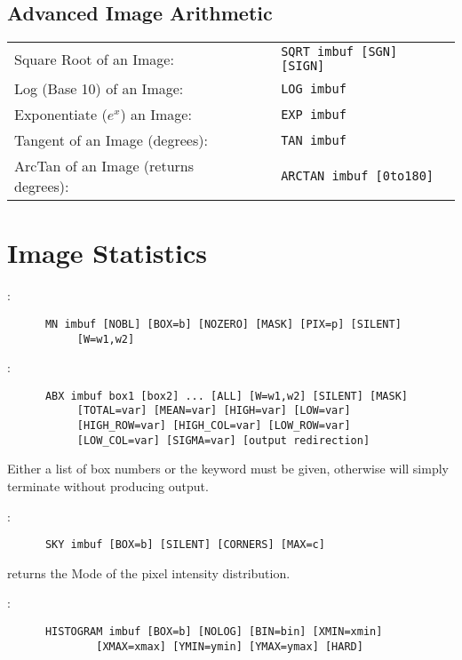\subsection{Advanced Image Arithmetic}

\begin{center}
   \begin{tabular}{lcl}
      Square Root of an Image:&&\verb+SQRT imbuf [SGN] [SIGN]+\\
      Log (Base 10) of an Image:&&\verb+LOG imbuf+\\
      Exponentiate ($e^x$) an Image:&&\verb+EXP imbuf+\\
      Tangent of an Image (degrees):&&\verb+TAN imbuf+\\
      ArcTan of an Image (returns degrees):&&\verb+ARCTAN imbuf [0to180]+\\
   \end{tabular}
\end{center}


\section{Image Statistics}

:
\begin{verbatim}
      MN imbuf [NOBL] [BOX=b] [NOZERO] [MASK] [PIX=p] [SILENT]
	       [W=w1,w2]
\end{verbatim}

\noindent {}:
\begin{verbatim}
      ABX imbuf box1 [box2] ... [ALL] [W=w1,w2] [SILENT] [MASK]
		   [TOTAL=var] [MEAN=var] [HIGH=var] [LOW=var]
		   [HIGH_ROW=var] [HIGH_COL=var] [LOW_ROW=var]
		   [LOW_COL=var] [SIGMA=var] [output redirection]
\end{verbatim}

\noindent Either a list of box numbers or the keyword  must be
given, otherwise  will simply terminate without producing output.

\noindent {}:
\begin{verbatim}
      SKY imbuf [BOX=b] [SILENT] [CORNERS] [MAX=c]
\end{verbatim}
 returns the Mode of the pixel intensity distribution.

\noindent {}:
\begin{verbatim}
      HISTOGRAM imbuf [BOX=b] [NOLOG] [BIN=bin] [XMIN=xmin]
		      [XMAX=xmax] [YMIN=ymin] [YMAX=ymax] [HARD]
\end{verbatim}

